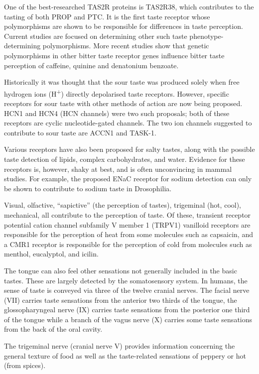 \documentclass[]{book}
\begin{document}
One of the best-researched TAS2R proteins is TAS2R38, which contributes to the tasting of both PROP and PTC. It is the first taste receptor whose polymorphisms are shown to be responsible for differences in taste perception. Current studies are focused on determining other such taste phenotype-determining polymorphisms. More recent studies show that genetic polymorphisms in other bitter taste receptor genes influence bitter taste perception of caffeine, quinine and denatonium benzoate.

Historically it was thought that the sour taste was produced solely when free hydrogen ions (H\textsuperscript{+}) directly depolarised taste receptors. However, specific receptors for sour taste with other methods of action are now being proposed. HCN1 and HCN4 (HCN channels) were two such proposals; both of these receptors are cyclic nucleotide-gated channels. The two ion channels suggested to contribute to sour taste are ACCN1 and TASK-1.

Various receptors have also been proposed for salty tastes, along with the possible taste detection of lipids, complex carbohydrates, and water. Evidence for these receptors is, however, shaky at best, and is often unconvincing in mammal studies. For example, the proposed ENaC receptor for sodium detection can only be shown to contribute to sodium taste in Drosophilia.

Visual, olfactive, ``sapictive'' (the perception of tastes), trigeminal (hot, cool), mechanical, all contribute to the perception of taste. Of these, transient receptor potential cation channel subfamily V member 1 (TRPV1) vanilloid receptors are responsible for the perception of heat from some molecules such as capsaicin, and a CMR1 receptor is responsible for the perception of cold from molecules such as menthol, eucalyptol, and icilin.

The tongue can also feel other sensations not generally included in the basic tastes. These are largely detected by the somatosensory system. In humans, the sense of taste is conveyed via three of the twelve cranial nerves. The facial nerve (VII) carries taste sensations from the anterior two thirds of the tongue, the glossopharyngeal nerve (IX) carries taste sensations from the posterior one third of the tongue while a branch of the vagus nerve (X) carries some taste sensations from the back of the oral cavity.

The trigeminal nerve (cranial nerve V) provides information concerning the general texture of food as well as the taste-related sensations of peppery or hot (from spices).
\end{document}
